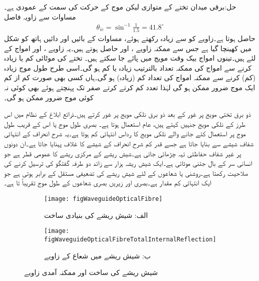حل:برقی میدان تختے کے متوازی لیکن موج کے حرکت کی سمت کے عمودی ہے۔مساوات  سے زاویہ فاصل
\begin{align}
\theta_{ic}=\sin^{-1} \frac{1}{1.5}=41.8^{\circ}
\end{align}
حاصل ہوتا ہے۔زاویے کو  سے زیادہ رکھتے  ہوئے، مساوات   کے  بائیں اور دائیں ہاتھ کو شکل  میں کھینچا گیا ہے جس سے ممکنہ زاویے ،  اور  حاصل ہوتے  ہیں۔یہ زاویے ،  اور  امواج کے لئے ہیں۔تینوں امواج بیک وقت مویج میں پائے جا سکتے ہیں۔ تختے کی موٹائی کم یا زیادہ کرنے سے امواج کی ممکنہ تعداد بالترتیب زیادہ یا کم ہو گی۔اسی طرح طول موج زیادہ (کم) کرنے سے ممکنہ امواج کی تعداد کم (زیادہ) ہو گی۔ہاں کسی بھی صورت کم از کم ایک موج ضرور ممکن ہو گی لہٰذا تعدد کم کرتے کرتے صفر تک پہنچتے ہوئے بھی کوئی نہ کوئی موج ضرور ممکن ہو گی۔

ذو برق تختی مویج پر غور کے بعد ذو برق نلکی مویج پر غور کرتے ہیں۔ذرائع ابلاغ کے نظام  میں اس طرز کے نلکی مویج جنہیں  کہتے ہیں،  عام استعمال ہوتا ہے۔ بصری طول موج  یا اس کے قریب طول موج پر استعمال کئے جانے والے نلکی مویج کا رداس انتہائی کم ہوتا ہے۔یہ  شرح انحراف کے انتہائی شفاف شیشے سے بنایا جاتا ہے جسے قدر کم  شرح انحراف  کے شیشے کا غلاف پہنایا جاتا ہے۔ان دونوں پر غیر شفاف حفاظتی تہہ چڑھائی جاتی ہے۔شیش ریشے کے مرکزی ریشے کا عمومی قطر  ہے جو انسانی سر کے بال جتنی موٹائی ہے۔ایک شیش ریشہ ہزار سے زائد دو طرفہ گفتگو کی ترسیل کرنے کی صلاحیت رکھتا ہے۔روشنی یا  شعاعوں کے لئے شیش ریشے کی تضعیفی مستقل   کے برابر ہوتی ہے جو ایک انتہائی کم مقدار ہے۔بصری اور زیریں بصری شعاعوں کے طول موج تقریباً  تا  ہے۔

\begin{figure}
\centering
\begin{subfigure}{0.45\textwidth}
\centering
\texttt{[image: figWaveguideOpticalFibre]}
\caption*{الف: شیش ریشے کی بنیادی ساخت}
\end{subfigure}%
%
\begin{subfigure}{0.5\textwidth}
\centering
\texttt{[image: figWaveguideOpticalFibreTotalInternalReflection]}
\caption*{ب: شیش ریشے میں شعاع کے  زاویے}
\end{subfigure}%
\caption{شیش ریشے کی ساخت اور ممکنہ آمدی زاویے}
\label{شکل_مویج_شیش_ریشہ}
\end{figure}

